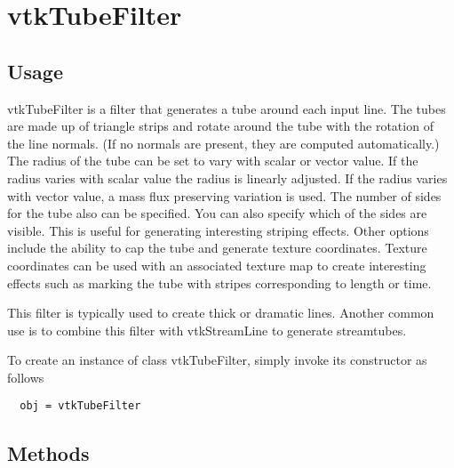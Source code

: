 \section{vtkTubeFilter}

\subsection{Usage}

 vtkTubeFilter is a filter that generates a tube around each input line. 
 The tubes are made up of triangle strips and rotate around the tube with
 the rotation of the line normals. (If no normals are present, they are
 computed automatically.) The radius of the tube can be set to vary with 
 scalar or vector value. If the radius varies with scalar value the radius
 is linearly adjusted. If the radius varies with vector value, a mass
 flux preserving variation is used. The number of sides for the tube also 
 can be specified. You can also specify which of the sides are visible. This
 is useful for generating interesting striping effects. Other options
 include the ability to cap the tube and generate texture coordinates.
 Texture coordinates can be used with an associated texture map to create
 interesting effects such as marking the tube with stripes corresponding
 to length or time.

 This filter is typically used to create thick or dramatic lines. Another
 common use is to combine this filter with vtkStreamLine to generate
 streamtubes.

To create an instance of class vtkTubeFilter, simply
invoke its constructor as follows
\begin{verbatim}
  obj = vtkTubeFilter
\end{verbatim}
\subsection{Methods}

